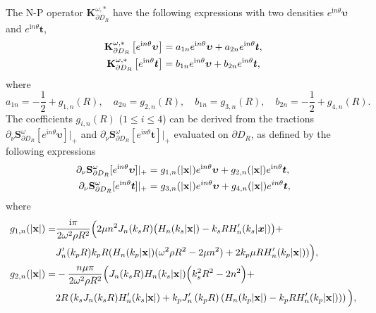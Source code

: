 \documentclass[10pt,a4paper]{amsart}
\newcommand{\bx}{\mathbf{x}}
\begin{document}
\begin{lem}\label{lem:npz}
	The N-P operator $\mathbf{K}_{\partial D_{R}}^{\omega,*}$ have the following expressions with two densities $e^{\mathrm{i}n\theta}\bm{\upsilon}$ and $e^{\mathrm{i}n\theta}\bm{t}$,
	\begin{align}
		\mathbf{K}_{\partial D_{R}}^{\omega,*}\left[e^{\mathrm{i}n\theta}\bm{\upsilon}\right]&=a_{1n}e^{\mathrm{i}n\theta}\bm{\upsilon}+a_{2n}e^{\mathrm{i}n\theta}\bm{t},\label{equ:kvt}\\
		\mathbf{K}_{\partial D_{R}}^{\omega,*}\left[e^{\mathrm{i}n\theta}\bm{t}\right]&=b_{1n}e^{\mathrm{i}n\theta}\bm{\upsilon}+b_{2n}e^{\mathrm{i}n\theta}\bm{t},\notag
	\end{align}
	where
	\begin{displaymath}
		a_{1n}=-\frac{1}{2}+g_{1,n}(R),\quad a_{2n}=g_{2,n}(R),\quad b_{1n}=g_{3,n}(R),\quad b_{2n}=-\frac{1}{2}+g_{4,n}(R).
	\end{displaymath}
	The coefficients $g_{i,n}(R)$ ($1 \leq i \leq 4$) can be derived from the tractions $\partial_{\nu}\mathbf{S}_{\partial D_{R}}^{\omega}[e^{\mathrm{i}n\theta}\bm{\upsilon}]\big|_{+}$ and $\partial_{\nu}\mathbf{S}_{\partial D_{R}}^{\omega}[e^{\mathrm{i}n\theta}\bm{t}]\big|_{+}$ evaluated on $\partial D_{R}$, as defined by the following expressions
	\begin{align}
		\partial_{\nu}\mathbf{S}_{\partial D_{R}}^{\omega}[e^{\mathrm{i}n\theta}\bm{\upsilon}]|_{+}&=g_{1,n}(|\bx|)e^{\mathrm{i}n\theta}\bm{\upsilon}+g_{2,n}(|\bx|)e^{\mathrm{i}n\theta}\bm{t},\notag\\
		\partial_{\nu}\mathbf{S}_{\partial D_{R}}^{\omega}[e^{\mathrm{i}n\theta}\bm{t}]|_{+}&=g_{3,n}(|\bx|)e^{in\theta}\bm{\upsilon}+g_{4,n}(|\bx|)e^{in\theta}\bm{t},\notag
	\end{align}
	where
	\begin{align}
		g_{1,n}(|\bx|)=&\frac{\mathrm{i}\pi}{2\omega^{2}\rho R^{2}}\Big(2\mu n^{2}J_{n}(k_{s}R)\big(H_{n}(k_{s}|\bx|)-k_{s}RH_{n}^{\prime}(k_{s}|\bm{x}|)\big)+ \notag\\
		&J_n^{\prime}(k_pR)k_pR(H_n(k_p|\bx|)(\omega^2\rho R^2-2\mu n^2)+2k_p\mu RH_n^{\prime}(k_p|\bx|))\Big), \notag\\
		g_{2,n}(|\bx|)=& - \frac{n\mu\pi}{2\omega^{2}\rho R^{2}}\Big(J_{n}(k_{s}R)H_{n}(k_{s}|\bx|)\Big(k_{s}^{2}R^{2}-2n^{2}\Big)+ \notag\\
		&2R\left(k_{s}J_{n}(k_{s}R)H_{n}^{\prime}(k_{s}|\bx|)+k_{p}J_{n}^{\prime}\left(k_{p}R\right)\left(H_{n}(k_{p}|\bx|)-k_{p}RH_{n}^{\prime}(k_{p}|\bx|)\right)\right)\Big), \notag\\

\end{align}
\end{lem}
\end{document}
